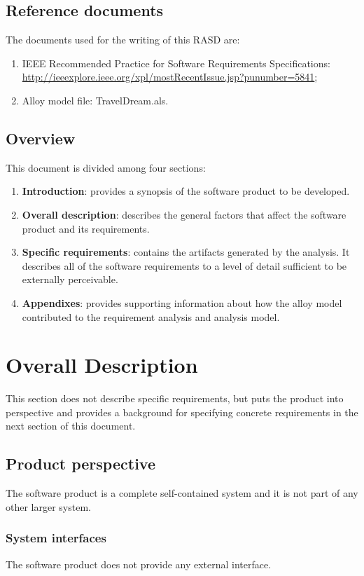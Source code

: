 \documentclass[a4paper,12pt]{book}
\begin{document}
\section{Reference documents}
The documents used for the writing of this RASD are:
\begin{enumerate}
  \item IEEE Recommended Practice for Software Requirements Specifications: \url{http://ieeexplore.ieee.org/xpl/mostRecentIssue.jsp?punumber=5841};
  \item Alloy model file: TravelDream.als.
\end{enumerate}

\section{Overview}
This document is divided among four sections:
\begin{enumerate}
  \item \textbf{Introduction}: provides a synopsis of the software product to be developed.
  \item \textbf{Overall description}: describes the general factors that affect the software product and its requirements.
  \item \textbf{Specific requirements}: contains the artifacts generated by the analysis. It describes all of the software requirements to a level of detail sufficient to be externally perceivable.
  \item \textbf{Appendixes}: provides supporting information about how the alloy model contributed to the requirement analysis and analysis model.
\end{enumerate}

\chapter{Overall Description}
This section does not describe specific requirements, but puts the product into perspective and provides a background for specifying concrete requirements in the next section of this document.

\section{Product perspective}
The software product is a complete self-contained system and it is not part of any other larger system.

\subsection{System interfaces}
The software product does not provide any external interface.
\end{document}
